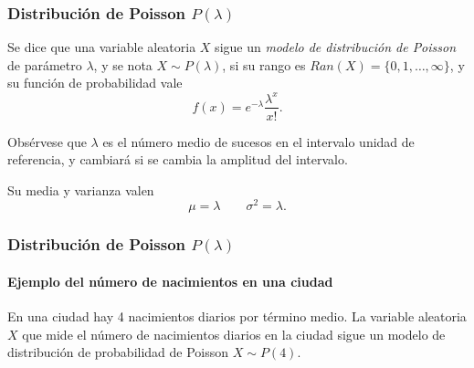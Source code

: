 \begin{frame}
\frametitle{Distribución de Poisson $P(\lambda)$}
\begin{definicion}
Se dice que una variable aleatoria $X$ sigue un \emph{modelo de distribución de Poisson} de parámetro $\lambda$, y se nota $X\sim P(\lambda)$, si su rango es $Ran(X) = \{0,1,\ldots,\infty\}$, y su función de probabilidad vale
\[
f(x) = e^{-\lambda}\frac{\lambda^x}{x!}.
\]
\end{definicion}

Obsérvese que $\lambda$ es el número medio de sucesos en el intervalo unidad de referencia, y cambiará si se cambia la amplitud del intervalo.

Su media y varianza valen
\[
\mu = \lambda \qquad \sigma^2 = \lambda.
\]

\end{frame}


\begin{frame}
\frametitle{Distribución de Poisson $P(\lambda)$}
\framesubtitle{Ejemplo del número de nacimientos en una ciudad}
En una ciudad hay 4 nacimientos diarios por término medio. 
La variable aleatoria $X$ que mide el número de nacimientos diarios en la ciudad sigue un modelo de distribución de probabilidad de Poisson $X\sim P(4)$.
\begin{center}
  \end{center}

\end{frame}


